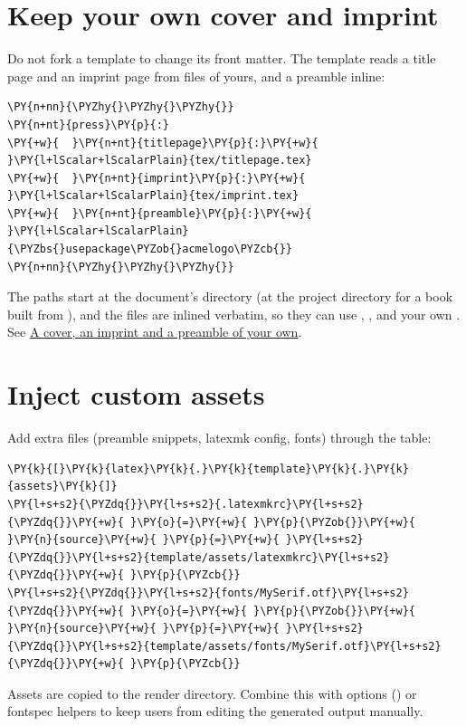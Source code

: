\documentclass[a4paper,twoside]{article}
\begin{document}
\section{Keep your own cover and imprint}
Do not fork a template to change its front matter. The  template reads a
title page and an imprint page from files of yours, and a preamble inline:
\begin{tscode}[lang=yaml, engine=pygments]
\begin{Verbatim}[commandchars=\\\{\},breaklines, breakanywhere, commandchars=\\\{\}]
\PY{n+nn}{\PYZhy{}\PYZhy{}\PYZhy{}}
\PY{n+nt}{press}\PY{p}{:}
\PY{+w}{  }\PY{n+nt}{titlepage}\PY{p}{:}\PY{+w}{ }\PY{l+lScalar+lScalarPlain}{tex/titlepage.tex}
\PY{+w}{  }\PY{n+nt}{imprint}\PY{p}{:}\PY{+w}{ }\PY{l+lScalar+lScalarPlain}{tex/imprint.tex}
\PY{+w}{  }\PY{n+nt}{preamble}\PY{p}{:}\PY{+w}{ }\PY{l+lScalar+lScalarPlain}{\PYZbs{}usepackage\PYZob{}acmelogo\PYZcb{}}
\PY{n+nn}{\PYZhy{}\PYZhy{}\PYZhy{}}
\end{Verbatim}
\end{tscode}
The paths start at the document's directory (at the project directory for a
book built from ), and the files are inlined verbatim, so they can
use , ,  and your own . See
\href{index.md\#a-cover-an-imprint-and-a-preamble-of-your-own}{A cover, an imprint and a preamble of your own}.
\section{Inject custom assets}
Add extra files (preamble snippets, latexmk config, fonts) through the  table:
\begin{tscode}[lang=toml, engine=pygments]
\begin{Verbatim}[commandchars=\\\{\},breaklines, breakanywhere, commandchars=\\\{\}]
\PY{k}{[}\PY{k}{latex}\PY{k}{.}\PY{k}{template}\PY{k}{.}\PY{k}{assets}\PY{k}{]}
\PY{l+s+s2}{\PYZdq{}}\PY{l+s+s2}{.latexmkrc}\PY{l+s+s2}{\PYZdq{}}\PY{+w}{ }\PY{o}{=}\PY{+w}{ }\PY{p}{\PYZob{}}\PY{+w}{ }\PY{n}{source}\PY{+w}{ }\PY{p}{=}\PY{+w}{ }\PY{l+s+s2}{\PYZdq{}}\PY{l+s+s2}{template/assets/latexmkrc}\PY{l+s+s2}{\PYZdq{}}\PY{+w}{ }\PY{p}{\PYZcb{}}
\PY{l+s+s2}{\PYZdq{}}\PY{l+s+s2}{fonts/MySerif.otf}\PY{l+s+s2}{\PYZdq{}}\PY{+w}{ }\PY{o}{=}\PY{+w}{ }\PY{p}{\PYZob{}}\PY{+w}{ }\PY{n}{source}\PY{+w}{ }\PY{p}{=}\PY{+w}{ }\PY{l+s+s2}{\PYZdq{}}\PY{l+s+s2}{template/assets/fonts/MySerif.otf}\PY{l+s+s2}{\PYZdq{}}\PY{+w}{ }\PY{p}{\PYZcb{}}
\end{Verbatim}
\end{tscode}
Assets are copied to the render directory. Combine this with  options () or fontspec helpers to keep users from editing the generated output manually.
\end{document}
